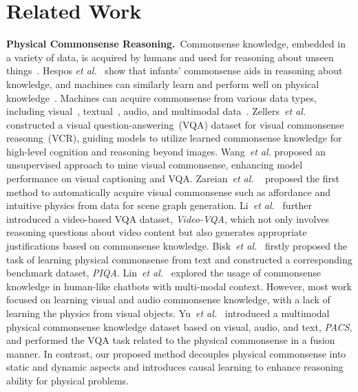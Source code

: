 \section{Related Work}
{\bf Physical Commonsense Reasoning.}~Commonsense knowledge, embedded in a variety of data, is acquired by humans and used for reasoning about unseen things~\cite{piloto2022intuitive}. Hespos {\it et al.}~\cite{hespos2016five} show that infants' commonsense aids in reasoning about knowledge, and machines can similarly learn and perform well on physical knowledge~\cite{piloto2022intuitive}. Machines can acquire commonsense from various data types, including visual~\cite{zellers2019recognition,li2022representation}, textual~\cite{bisk2020piqa}, audio\cite{zellers2022merlot}, and multimodal data~\cite{yu2022pacs}. 
Zellers~{\it et al.}~\cite{zellers2019recognition} constructed a visual question-answering~(VQA) dataset for visual commonsense reasonng~(VCR), guiding models to utilize learned commonsense knowledge for high-level cognition and reasoning beyond images. Wang~{\it et al.}\cite{wang2020visual} proposed an unsupervised approach to mine visual commonsense, enhancing model performance on visual captioning and VQA. Zareian~{\it et al.} ~\cite{zareian2020learning} proposed the first method to automatically acquire visual commonsense such as affordance and intuitive physics from data for scene graph generation. Li~{\it et al.}~\cite{li2022representation} further introduced a video-based VQA dataset, \emph{Video-VQA}, which not only involves reasoning questions about video content but also generates appropriate justifications based on commonsense knowledge. Bisk~{\it et al.}~\cite{bisk2020piqa} firstly proposed the task of learning physical commonsense from text and constructed a corresponding benchmark dataset, \emph{PIQA}. Lin~{\it et al.}~\cite{lin2023tiktalk} explored the usage of commonsense knowledge in human-like chatbots with multi-modal context. However, most work focused on learning visual and audio commonsense knowledge, with a lack of learning the physics from visual objects. Yu~{\it et al.}~\cite{yu2022pacs} introduced a multimodal physical commonsense knowledge dataset based on visual, audio, and text, \emph{PACS}, and performed the VQA task related to the physical commonsense in a fusion manner. In contrast, our proposed method decouples physical commonsense into static and dynamic aspects and introduces causal learning to enhance reasoning ability for physical problems. 

